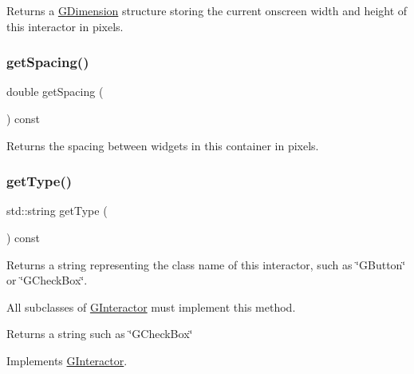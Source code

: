 Returns a \mbox{\hyperlink{classGDimension}{G\+Dimension}} structure storing the current onscreen width and height of this interactor in pixels. 

\mbox{\label{classGContainer_a9a7e859eeff5cc7de46d65b9be7afc3c}} 
\subsubsection{\texorpdfstring{get\+Spacing()}{getSpacing()}}
{\footnotesize\ttfamily double get\+Spacing (\begin{DoxyParamCaption}{ }\end{DoxyParamCaption}) const\hspace{0.3cm}{\ttfamily [virtual]}}



Returns the spacing between widgets in this container in pixels. 

\mbox{\label{classGContainer_a9896d58fcfebbf1025aeeb5b8b9ede80}} 
\subsubsection{\texorpdfstring{get\+Type()}{getType()}}
{\footnotesize\ttfamily std\+::string get\+Type (\begin{DoxyParamCaption}{ }\end{DoxyParamCaption}) const\hspace{0.3cm}{\ttfamily [virtual]}}



Returns a string representing the class name of this interactor, such as \char`\"{}\+G\+Button\char`\"{} or \char`\"{}\+G\+Check\+Box\char`\"{}. 

All subclasses of \mbox{\hyperlink{classGInteractor}{G\+Interactor}} must implement this method. \begin{DoxyReturn}{Returns}
a string such as \char`\"{}\+G\+Check\+Box\char`\"{} 
\end{DoxyReturn}


Implements \mbox{\hyperlink{classGInteractor_a799e073a127b428cc841086d42ea4fed}{G\+Interactor}}.

\mbox{\label{classGContainer_a326ee51b5561f807df7b29a1c101f7fd}} 
